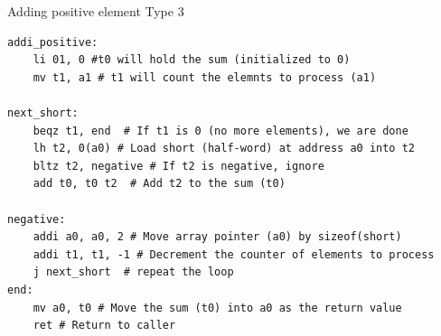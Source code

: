 \begin{parag}{Adding positive element Type 3}
	\begin{lstlisting}[language={[RISC-V]Assembler}]
addi_positive:
	li 01, 0 #t0 will hold the sum (initialized to 0)
	mv t1, a1 # t1 will count the elemnts to process (a1)

next_short:
	beqz t1, end  # If t1 is 0 (no more elements), we are done
	lh t2, 0(a0) # Load short (half-word) at address a0 into t2
	bltz t2, negative # If t2 is negative, ignore
	add t0, t0 t2  # Add t2 to the sum (t0)

negative:
	addi a0, a0, 2 # Move array pointer (a0) by sizeof(short)
	addi t1, t1, -1 # Decrement the counter of elements to process
	j next_short  # repeat the loop
end:
	mv a0, t0 # Move the sum (t0) into a0 as the return value
	ret # Return to caller
\end{lstlisting}

\end{parag}

